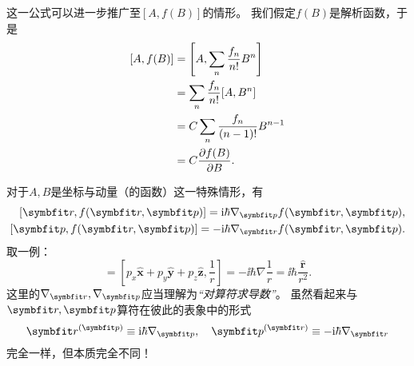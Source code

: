 这一公式可以进一步推广至$[A,f(B)]$的情形。
我们假定$f(B)$是解析函数，于是
\begin{equation}
\begin{aligned}
    \relax
    [A,f(B)]
    &= \left[A, \sum_n \frac{f_n}{n!} B^n\right] \\
    &= \sum_n \frac{f_n}{n!} [A, B^n] \\
    &= C \sum_n \frac{f_n}{(n-1)!} B^{n-1} \\
    &= C \frac{\partial f(B)}{\partial B}.
\end{aligned}
\end{equation}

对于$A,B$是坐标与动量（的函数）这一特殊情形，有
\begin{equation}
\begin{aligned}
    \relax
    [\rr, f(\rr,\pp)] = \ii\hbar\nabla_{\pp} f(\rr,\pp), \\
    [\pp, f(\rr,\pp)] = -\ii\hbar\nabla_{\rr} f(\rr,\pp).
\end{aligned}
\end{equation}
取一例：
\begin{equation}
    [\pp, \frac{1}{r}] = [p_x \hat{\bm{x}} + p_y \hat{\bm{y}} + p_z \hat{\bm{z}}, \frac{1}{r}] = -\ii\hbar \nabla \frac{1}{r} = \ii\hbar \frac{\hat{\bm{r}}}{r^2}.
\end{equation}
这里的$\nabla_{\rr}, \nabla_{\pp}$应当理解为\emph{``对算符求导数''}。
虽然看起来与$\rr,\pp$算符在彼此的表象中的形式
\begin{equation}
    \rr^{(\pp)}\equiv\ii\hbar\nabla_{\pp},
    \quad \pp^{(\rr)}\equiv-\ii\hbar\nabla_{\rr}
\end{equation}
完全一样，但本质完全不同！
